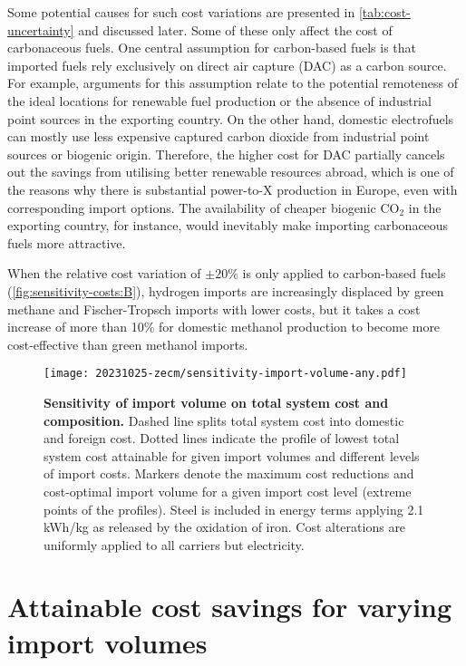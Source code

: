 Some potential causes for such cost variations are presented in
\cref{tab:cost-uncertainty} and discussed later. Some of these only affect the
cost of carbonaceous fuels. One central assumption for carbon-based fuels is
that imported fuels rely exclusively on direct air capture (DAC) as a carbon
source. For example, arguments for this assumption relate to the potential
remoteness of the ideal locations for renewable fuel production or the absence
of industrial point sources in the exporting country. On the other hand,
domestic electrofuels can mostly use less expensive captured carbon dioxide from
industrial point sources or biogenic origin. Therefore, the higher cost for DAC
partially cancels out the savings from utilising better renewable resources
abroad, which is one of the reasons why there is substantial power-to-X
production in Europe, even with corresponding import options. The availability
of cheaper biogenic CO$_2$ in the exporting country, for instance, would
inevitably make importing carbonaceous fuels more attractive.

When the relative cost variation of $\pm 20\%$ is only applied to carbon-based
fuels (\cref{fig:sensitivity-costs:B}), hydrogen imports are increasingly
displaced by green methane and Fischer-Tropsch imports with lower costs, but it
takes a cost increase of more than 10\% for domestic methanol production to
become more cost-effective than green methanol imports. 


\begin{figure*}
    \texttt{[image: 20231025-zecm/sensitivity-import-volume-any.pdf]}
    \caption{\textbf{Sensitivity of import volume on total system cost and composition.} 
        Dashed line splits total system cost into domestic and foreign cost.
        Dotted lines indicate the profile of lowest total system cost attainable for given import volumes and different levels of import costs.
        Markers denote the maximum cost reductions and cost-optimal import volume for a given import cost level (extreme points of the profiles).
        Steel is included in energy terms applying 2.1 kWh/kg as released by the oxidation of iron.
        Cost alterations are uniformly applied to all carriers but electricity.
    }
    \label{fig:sensitivity-volume}
\end{figure*}

\section*{Attainable cost savings for varying import volumes}

